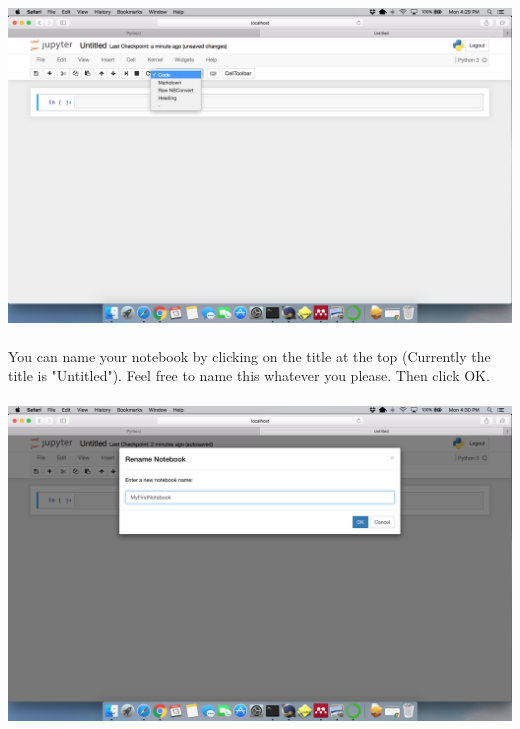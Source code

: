 \documentclass[]{article}
\begin{document}
\paragraph{}
\begin{centering}
    \centerline{\includegraphics[scale=0.25]{Screenshot_21.png}}
\end{centering}

\paragraph{}
You can name your notebook by clicking on the title at the top (Currently the title is "Untitled"). Feel free to name this whatever you please. Then click OK.
\paragraph{}
\begin{centering}
    \centerline{\includegraphics[scale=0.25]{Screenshot_22.png}}
\end{centering}
\end{document}
